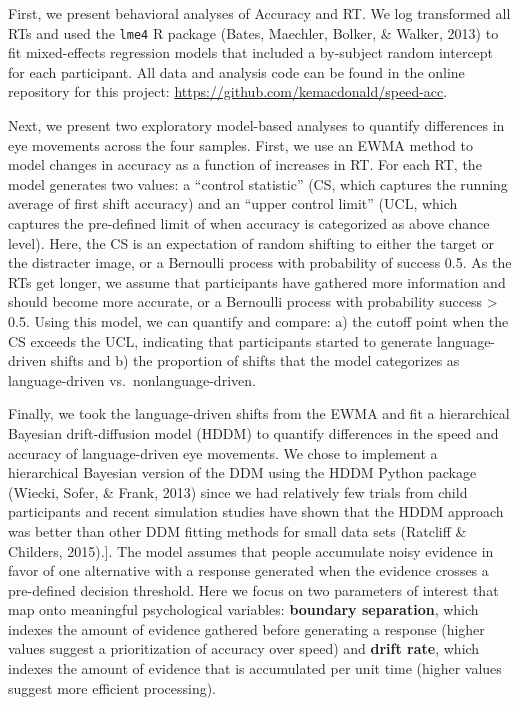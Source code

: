 \documentclass[10pt, letterpaper]{article}
\begin{document}
First, we present behavioral analyses of Accuracy and RT. We log
transformed all RTs and used the \texttt{lme4} R package (Bates,
Maechler, Bolker, \& Walker, 2013) to fit mixed-effects regression
models that included a by-subject random intercept for each participant.
All data and analysis code can be found in the online repository for
this project: \url{https://github.com/kemacdonald/speed-acc}.

Next, we present two exploratory model-based analyses to quantify
differences in eye movements across the four samples. First, we use an
EWMA method to model changes in accuracy as a function of increases in
RT. For each RT, the model generates two values: a ``control statistic''
(CS, which captures the running average of first shift accuracy) and an
``upper control limit'' (UCL, which captures the pre-defined limit of
when accuracy is categorized as above chance level). Here, the CS is an
expectation of random shifting to either the target or the distracter
image, or a Bernoulli process with probability of success 0.5. As the
RTs get longer, we assume that participants have gathered more
information and should become more accurate, or a Bernoulli process with
probability success \textgreater{} 0.5. Using this model, we can
quantify and compare: a) the cutoff point when the CS exceeds the UCL,
indicating that participants started to generate language-driven shifts
and b) the proportion of shifts that the model categorizes as
language-driven vs.~nonlanguage-driven.

Finally, we took the language-driven shifts from the EWMA and fit a
hierarchical Bayesian drift-diffusion model (HDDM) to quantify
differences in the speed and accuracy of language-driven eye movements.
We chose to implement a hierarchical Bayesian version of the DDM using
the HDDM Python package (Wiecki, Sofer, \& Frank, 2013) since we had
relatively few trials from child participants and recent simulation
studies have shown that the HDDM approach was better than other DDM
fitting methods for small data sets (Ratcliff \& Childers, 2015).{]}.
The model assumes that people accumulate noisy evidence in favor of one
alternative with a response generated when the evidence crosses a
pre-defined decision threshold. Here we focus on two parameters of
interest that map onto meaningful psychological variables:
\textbf{boundary separation}, which indexes the amount of evidence
gathered before generating a response (higher values suggest a
prioritization of accuracy over speed) and \textbf{drift rate}, which
indexes the amount of evidence that is accumulated per unit time (higher
values suggest more efficient processing).
\end{document}
